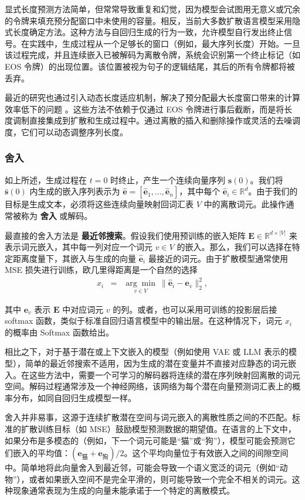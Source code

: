 \documentclass[UTF8,a4paper,zihao=-4,oneside,openany]{ctexbook}
\begin{document}
显式长度预测方法简单，但常常导致重复和幻觉，因为模型会试图用无意义或冗余的令牌来填充预分配窗口中未使用的容量。相反，当前大多数扩散语言模型采用隐式长度确定方法。这种方法与自回归生成的行为一致，允许模型自行发出终止信号。在实践中，生成过程从一个足够长的窗口（例如，最大序列长度）开始。一旦该过程完成，并且连续嵌入已被解码为离散令牌，系统会识别第一个终止标记（如 EOS 令牌）的出现位置。该位置被视为句子的逻辑结尾，其后的所有令牌都将被丢弃。

最近的研究也通过引入动态长度适应机制，解决了预分配最大长度窗口带来的计算效率低下的问题 \citep{li-etal:2025fixed,yang-etal:2025diffusion}。这些方法不依赖于仅通过 EOS 令牌进行事后截断，而是将长度调制直接集成到扩散和生成过程中。通过离散的插入和删除操作或灵活的去噪调度，它们可以动态调整序列长度。
\subsubsection{舍入}

如上所述，生成过程在 $t=0$ 时终止，产生一个连续向量序列 $\mathbf{s}(0)$。我们将 $\bar{\mathbf{s}}(0)$ 内生成的嵌入序列表示为 $\hat{\mathbf{e}} = [\hat{\mathbf{e}}_1, \dots, \hat{\mathbf{e}}_n]$，其中每个 $\hat{\mathbf{e}}_i \in \mathbb{R}^d$。由于我们的目标是生成文本，必须将这些连续向量映射回词汇表 $V$ 中的离散词元。此操作通常被称为 \textbf{舍入} 或解码。

最直接的舍入方法是 \textbf{最近邻搜索}。假设我们使用预训练的嵌入矩阵 $\mathbf{E} \in \mathbb{R}^{d \times |V|}$ 来表示词元嵌入，其中每一列对应一个词元 $v \in V$ 的嵌入。那么，我们可以选择在特定距离度量下，其嵌入与生成的向量 $\hat{\mathbf{e}}_i$ 最接近的词元。由于扩散模型通常使用 MSE 损失进行训练，欧几里得距离是一个自然的选择
\begin{eqnarray}
x_i & = & \underset{v \in V}{\arg\min} \ \|\hat{\mathbf{e}}_i - \mathbf{e}_v\|_2^2,
\end{eqnarray}

\noindent 其中 $\mathbf{e}_v$ 表示 $\mathbf{E}$ 中对应词元 $v$ 的列。或者，也可以采用可训练的投影层后接 softmax 函数，类似于标准自回归语言模型中的输出层。在这种情况下，词元 $x_i$ 的概率由 Softmax 函数给出。

相比之下，对于基于潜在或上下文嵌入的模型（例如使用 VAE 或 LLM 表示的模型），简单的最近邻搜索不适用，因为生成的潜在变量并不直接对应静态的词元嵌入。在这些方法中，需要一个可学习的解码器将连续的潜在序列映射回离散的词元空间。解码过程通常涉及一个神经网络，该网络为每个潜在向量预测词汇表上的概率分布，如同自回归生成模型一样。

舍入并非易事，这源于连续扩散潜在空间与词元嵌入的离散性质之间的不匹配。标准的扩散训练目标（如 MSE）鼓励模型预测数据的期望值。在语言的上下文中，如果分布是多模态的（例如，下一个词元可能是“猫”或“狗”），模型可能会预测它们嵌入的平均值：$(\mathbf{e}_{\text{猫}} + \mathbf{e}_{\text{狗}})/2$。这个平均向量位于有效嵌入之间的间隙空间中。简单地将此向量舍入到最近邻，可能会导致一个语义宽泛的词元（例如“动物”），或者如果嵌入空间不是完全平滑的，则可能导致一个完全不相关的词元。这种现象通常表现为生成的向量未能承诺于一个特定的离散模式。
\end{document}
